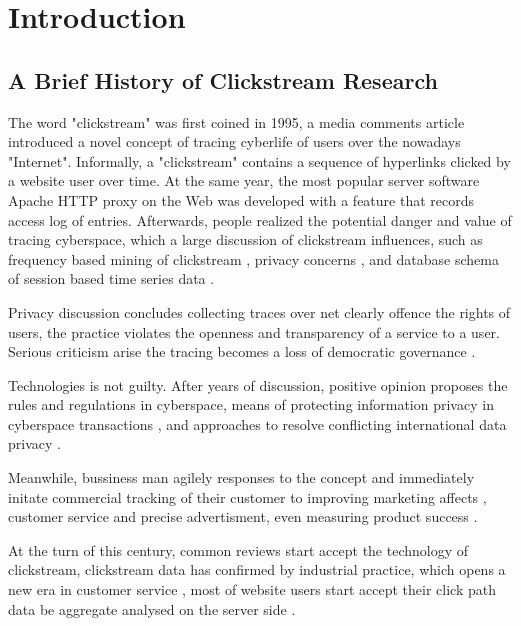 \section{Introduction}
\label{ch:intro}

\subsection{A Brief History of Clickstream Research}


The word "clickstream" \cite{friedman1995} was first coined in 1995, a media comments 
article introduced a novel concept of tracing cyberlife of users over the nowadays 
"Internet". Informally, a "clickstream" contains a sequence of hyperlinks clicked by a 
website user over time. At the same year, the most popular server software 
Apache HTTP \cite{apache1995http} proxy on the Web was developed with a feature that 
records access log of entries. Afterwards, people realized the potential danger and value 
of tracing cyberspace, which a large discussion of clickstream influences, such as 
frequency based mining of clickstream \cite{brodwin1995}, privacy concerns 
\cite{reidenberg1996governing}, and database schema of session based time series data 
\cite{courtheoux2000database}.


Privacy discussion concludes collecting traces over net clearly offence the rights of users,
the practice violates the openness and transparency of a service to a user.
Serious criticism arise the tracing becomes a loss of democratic governance \cite{gindin1997lost}.

Technologies is not guilty. After years of discussion, positive opinion proposes the rules 
\cite{reidenberg1996governing} and regulations \cite{skok1999establishing} in cyberspace,
means of protecting information privacy in cyberspace transactions \cite{kang1997information},
and approaches to resolve conflicting international data privacy \cite{reidenberg1999resolving}.

Meanwhile, bussiness man agilely responses to the concept and immediately initate 
commercial tracking of their customer to improving marketing affects \cite{novick1995}, 
customer service and precise advertisment\cite{reagle1999platform, bucklin2000sticky}, 
even measuring product success \cite{schonberg2000measuring}.

At the turn of this century, common reviews start accept the technology of clickstream,
clickstream data has confirmed by industrial practice, which opens a new era in 
customer service \cite{walsh2000internet}, most of website users start accept their click path data 
be aggregate analysed on the server side \cite{carr2000hypermediation}.

